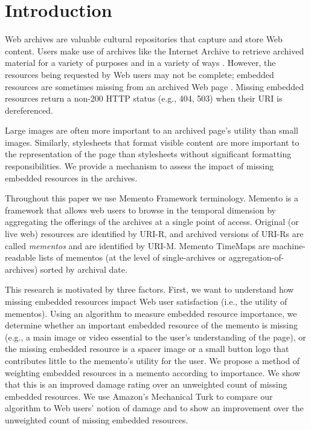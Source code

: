 \section{Introduction}
\label{introduction}
Web archives are valuable cultural repositories that capture and store Web content. Users make use of archives like the Internet Archive \cite{iawebarchive, waybackarchives2} to retrieve archived material \cite{usingIA, marshalls_social_media_study} for a variety of purposes and in a variety of ways \cite{yasminLinks}. However, the resources being requested by Web users may not be complete; embedded resources are sometimes missing from an archived Web page \cite{ipresArchivability}. Missing embedded resources return a non-200 HTTP status (e.g., 404, 503) when their URI is dereferenced.

Large images are often more important to an archived page's utility than small images. Similarly, stylesheets that format visible content are more important to the representation of the page than stylesheets without significant formatting responsibilities. We provide a mechanism to assess the impact of missing embedded resources in the archives.

Throughout this paper we use Memento Framework terminology. Memento \cite{nelson:memento:tr} is a framework that allows web users to browse in the temporal dimension by aggregating the offerings of the archives at a single point of access. Original (or live web) resources are identified by URI-R, and archived versions of URI-Rs are called \emph{mementos} and are identified by URI-M. Memento TimeMaps are machine-readable lists of mementos (at the level of single-archives or aggregation-of-archives) sorted by archival date.

This research is motivated by three factors. First, we want to understand how missing embedded resources impact Web user satisfaction (i.e., the utility of mementos). Using an algorithm to measure embedded resource importance, we determine whether an important embedded resource of the memento is missing (e.g., a main image or video essential to the user's understanding of the page), or the missing embedded resource is a spacer image or a small button logo that contributes little to the memento's utility for the user. We propose a method of weighting embedded resources in a memento according to importance. We show that this is an improved damage rating over an unweighted count of missing embedded resources. We use Amazon's Mechanical Turk to compare our algorithm to Web users' notion of damage and to show an improvement over the unweighted count of missing embedded resources.

